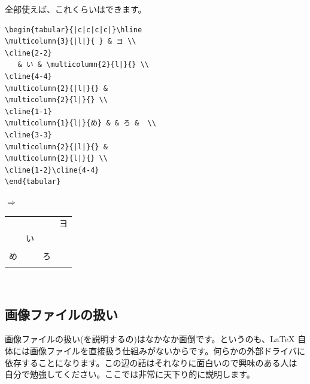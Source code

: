 全部使えば、これくらいはできます。\\
\begin{minipage}[c]{.50\textwidth}
\begin{screen}
\small
\begin{verbatim}
\begin{tabular}{|c|c|c|c|}\hline
\multicolumn{3}{|l|}{ } & ヨ \\
\cline{2-2}
   & い & \multicolumn{2}{l|}{} \\
\cline{4-4}
\multicolumn{2}{|l|}{} &
\multicolumn{2}{l|}{} \\
\cline{1-1}
\multicolumn{1}{l|}{め} & & ろ &  \\
\cline{3-3}
\multicolumn{2}{|l|}{} &
\multicolumn{2}{l|}{} \\
\cline{1-2}\cline{4-4}
\end{tabular}
\end{verbatim}
\end{screen}
\end{minipage}%
$\Rightarrow$
\begin{minipage}{.45\textwidth}
\begin{shadebox}
\begin{center}
\begin{tabular}{|c|c|c|c|}\hline
\multicolumn{3}{|l|}{ } & ヨ \\
\cline{2-2}
   & い & \multicolumn{2}{l|}{} \\
\cline{4-4}
\multicolumn{2}{|l|}{} &
\multicolumn{2}{l|}{} \\
\cline{1-1}
\multicolumn{1}{l|}{め} & & ろ &  \\
\cline{3-3}
\multicolumn{2}{|l|}{} &
\multicolumn{2}{l|}{} \\
\cline{1-2}\cline{4-4}
\end{tabular}
\end{center}
\end{shadebox}
\end{minipage}
\vspace*{1mm}\\

\subsection{画像ファイルの扱い}\label{sub:image}
画像ファイルの扱い(を説明するの)はなかなか面倒です。というのも、{\LaTeX}
自体には画像ファイルを直接扱う仕組みがないからです。何らかの外部ドライバに
依存することになります。この辺の話はそれなりに面白いので興味のある人は
自分で勉強してください。ここでは非常に天下り的に説明します。

